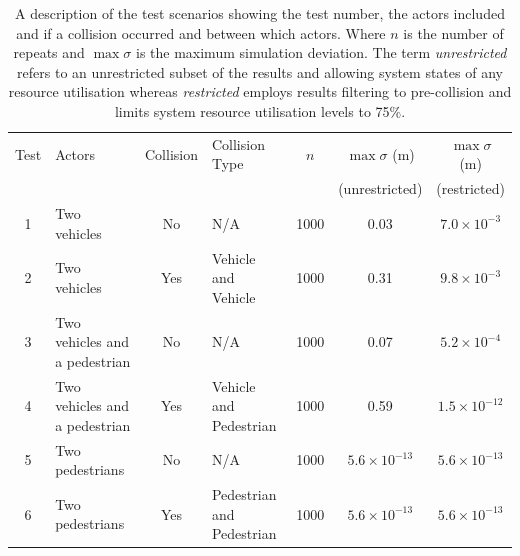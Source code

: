 \documentclass[letterpaper, 10 pt, journal, twoside]{IEEEtran}
\begin{document}
\begin{table}[b]
\centering
\begin{tabular}{clclccc}
\toprule
Test & Actors 					 	  & Collision 	 & Collision Type 			 & $n$  & $\max\sigma$ (m) & $\max\sigma$ (m) \\ 
	 & 								  & 			 & 							 &	    & (unrestricted)  & (restricted)	\\ \midrule
1    & Two vehicles                   & No  		 & N/A 			  			 & 1000 & 0.03 & $7.0{\times}10^{-3}$ \\
2    & Two vehicles                   & Yes 		 & Vehicle and Vehicle 		 & 1000 & 0.31 & $9.8{\times}10^{-3}$ \\
3    & Two vehicles and a pedestrian  & No  		 & N/A 			  			 & 1000 & 0.07 & $5.2{\times}10^{-4}$ \\
4    & Two vehicles and a pedestrian  & Yes 		 & Vehicle and Pedestrian 	 & 1000 & 0.59 & $1.5{\times}10^{-12}$ \\
5    & Two pedestrians                & No  		 & N/A 			  			 & 1000 & $5.6{\times}10^{-13}$ & $5.6{\times}10^{-13}$ \\
6    & Two pedestrians                & Yes 		 & Pedestrian and Pedestrian & 1000 & $5.6{\times}10^{-13}$ & $5.6{\times}10^{-13}$ \\
\bottomrule
\end{tabular}
\caption{A description of the test scenarios showing the test number, the actors included and if a collision occurred and between which actors. Where $n$ is the number of repeats and $\max\sigma$ is the maximum simulation deviation. The term \textit{unrestricted} refers to an unrestricted subset of the results and allowing system states of any resource utilisation whereas \textit{restricted} employs results filtering to pre-collision and limits system resource utilisation levels to 75\%.}
\label{TableOfExperiments}
\end{table}

\end{document}

